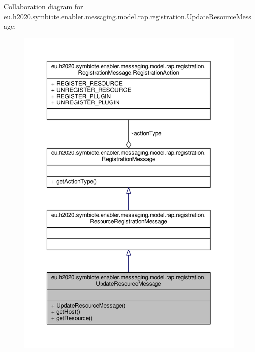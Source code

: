 Collaboration diagram for eu.\+h2020.\+symbiote.\+enabler.\+messaging.\+model.\+rap.\+registration.\+Update\+Resource\+Message\+:
\nopagebreak
\begin{figure}[H]
\begin{center}
\leavevmode
\includegraphics[width=350pt]{classeu_1_1h2020_1_1symbiote_1_1enabler_1_1messaging_1_1model_1_1rap_1_1registration_1_1UpdateResourceMessage__coll__graph}
\end{center}
\end{figure}
